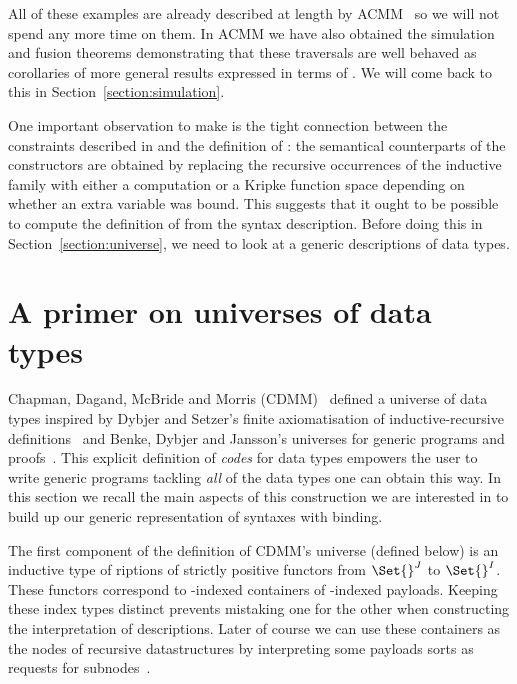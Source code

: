 All of these examples are already described at length by ACMM~\citeyear{allais2017type}
so we will not spend any
more time on them. In ACMM we have also obtained the simulation and fusion
theorems demonstrating that these traversals are well behaved as
corollaries of more general results expressed in terms of \semfun{}.
We will come back to this in Section~\ref{section:simulation}.

One important observation to make is the tight connection between the constraints
described in \semrec{} and the definition of : the semantical counterparts
of the  constructors are obtained by replacing the recursive occurrences of
the inductive family with either a computation or a Kripke function space depending
on whether an extra variable was bound. This suggests that it ought to be possible
to compute the definition of \semrec{} from the syntax description. Before doing this
in Section~\ref{section:universe}, we need to look at a generic descriptions of
data types.




\section{A primer on universes of data types}\label{section:data}

Chapman, Dagand, McBride and Morris (CDMM)~\citeyear{Chapman:2010:GAL:1863543.1863547}
defined a universe of data types inspired by Dybjer and Setzer's
finite axiomatisation of inductive-recursive definitions~\citeyear{Dybjer1999}
and Benke, Dybjer and Jansson's universes for generic programs and proofs~\citeyear{benke-ugpp}.
This explicit definition of \emph{codes} for data types empowers the
user to write generic programs tackling \emph{all} of the data types
one can obtain this way. In this section we recall the main aspects
of this construction we are interested in to build up our generic
representation of syntaxes with binding.

The first component of the definition of CDMM's universe (defined below) is an inductive type of
riptions of strictly positive functors from $\Set{}^J$ to $\Set{}^I$.
These functors correspond to -indexed containers of -indexed
payloads. Keeping these index types distinct prevents mistaking one for the
other when constructing the interpretation of descriptions. Later of course
we can use these containers as the nodes of recursive datastructures by
interpreting some payloads sorts as requests for
subnodes~\cite{DBLP:journals/jfp/AltenkirchGHMM15}.

